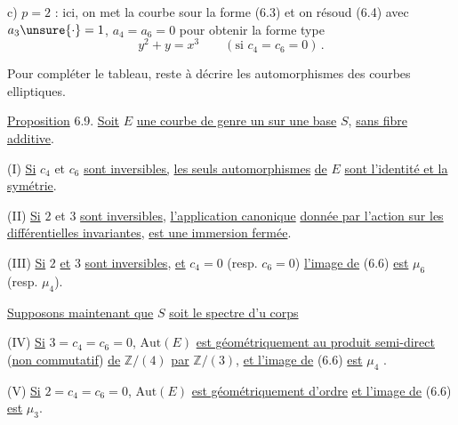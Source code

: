 c) $p=2$ : ici, on met la courbe sour la forme (6.3) et on résoud (6.4) avec $a_3\unsure{\cdot}=1$, $a_4=a_6=0$ pour obtenir la forme type
\[
y^2+y=x^3 \qquad (\text{si }c_4=c_6=0) \, . \tag*{(6.8)}
\]

Pour compléter le tableau, reste à décrire les automorphismes des courbes elliptiques.

\uline{Proposition} 6.9. \quad \uline{Soit} $E$ \uline{une courbe de genre un sur une base} $S$, \uline{sans fibre additive}.

(I) \quad \uline{Si} $c_4$ et $c_6$ \uline{sont inversibles,} \uline{les seuls automorphismes} \uline{de} $E$ \uline{sont l'identité et la symétrie}.

(II) \quad \uline{Si} $2$ et $3$ \uline{sont inversibles}, \uline{l'application canonique}
\uline{donnée par l'action sur les différentielles invariantes}, \uline{est une immersion fermée}.

(III) \uline{Si} $2$ \uline{et} $3$ \uline{sont inversibles}, \uline{et} $c_4=0$ (resp. $c_6=0$) \uline{l'image de} (6.6) \uline{est} $\mu_6$ (resp. $\mu_4$).

\uline{Supposons maintenant que} $S$ \uline{soit le spectre d'u corps}

(IV) \quad \uline{Si} $3=c_4=c_6=0$, $\mathrm{Aut}(E)$ \uline{est géométriquement  au produit semi-direct} (\uline{non commutatif}) \uline{de} $\mathbb{Z}/(4)$ \uline{par} $\mathbb{Z}/(3)$, \uline{et l'image de} (6.6) \uline{est} $\mu_4$ .

(V) \quad \uline{Si} $2=c_4=c_6=0$, $\mathrm{Aut}(E)$ \uline{est géométriquement d'ordre}  \uline{et l'image de} (6.6) \uline{est} $\mu_3$.

